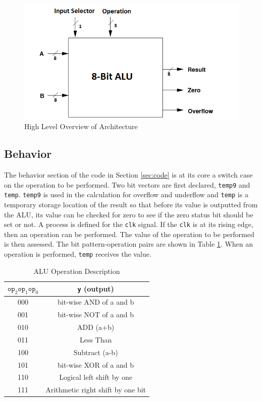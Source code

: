 \documentclass[12pt]{article}
\begin{document}
\begin{figure}[H]
\centering
\includegraphics[width=0.7\linewidth]{high-level-overview}
\caption{High Level Overview of Architecture}
\label{fig:high-level-overview}
\end{figure}

\subsection{Behavior}
The behavior section of the code in Section \ref{sec:code} is at its core a switch case on the operation to be performed. Two bit vectors are first declared, \texttt{temp9} and \texttt{temp}. \texttt{temp9} is used in the calculation for overflow and underflow and \texttt{temp} is a temporary storage location of the result so that before its value is outputted from the ALU, its value can be checked for zero to see if the zero status bit should be set or not. A process is defined for the \texttt{clk} signal. If the \texttt{clk} is at its rising edge, then an operation can be performed. The value of the operation to be performed is then assessed. The bit pattern-operation pairs are shown in Table \ref{tab:operations}. When an operation is performed, \texttt{temp} receives the value. 

\begin{table}[H]
	\centering
	\begin{tabular}{|c|c|}
		\hline
		$\texttt{op}_2$$\texttt{op}_1$$\texttt{op}_0$ & \texttt{y} (output) \\ 
		\hline
		000 & bit-wise AND of a and b\\
		\hline
		001 & bit-wise NOT of a and b\\
		\hline
		010 & ADD (a+b) \\
		\hline
		011 & Less Than\\
		\hline
		100 & Subtract (a-b)\\
		\hline
		101 & bit-wise XOR of a and b\\
		\hline
		110 & Logical left shift by one \\
		\hline
		111 & Arithmetic right shift by one bit \\
		\hline
		
	\end{tabular}
	\caption{ALU Operation Description}
	\label{tab:operations}
\end{table}
\end{document}
